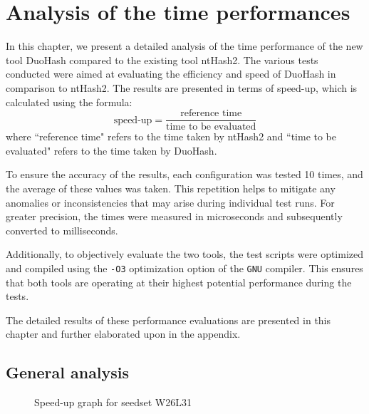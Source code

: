 \section{Analysis of the time performances}
\label{sec:performances}

In this chapter, we present a detailed analysis of the time performance of the new tool DuoHash compared to the existing tool ntHash2. The various tests conducted were aimed at evaluating the efficiency and speed of DuoHash in comparison to ntHash2. The results are presented in terms of speed-up, which is calculated using the formula: \[ \text{speed-up} = \frac{\text{reference time}}{\text{time to be evaluated}} \] where “reference time" refers to the time taken by ntHash2 and “time to be evaluated" refers to the time taken by DuoHash.

To ensure the accuracy of the results, each configuration was tested 10 times, and the average of these values was taken. This repetition helps to mitigate any anomalies or inconsistencies that may arise during individual test runs. For greater precision, the times were measured in microseconds and subsequently converted to milliseconds.

Additionally, to objectively evaluate the two tools, the test scripts were optimized and compiled using the \verb|-O3| optimization option of the \verb|GNU| compiler. This ensures that both tools are operating at their highest potential performance during the tests.

The detailed results of these performance evaluations are presented in this chapter and further elaborated upon in the appendix.




	\subsection{General analysis}
	\label{subsec:general-analysis}
	
	\begin{figure}[!ht]
		\centering
		\caption{Speed-up graph for seedset W26L31}
		\label{fig:speedup-small-W26L31}
	\end{figure}
	
